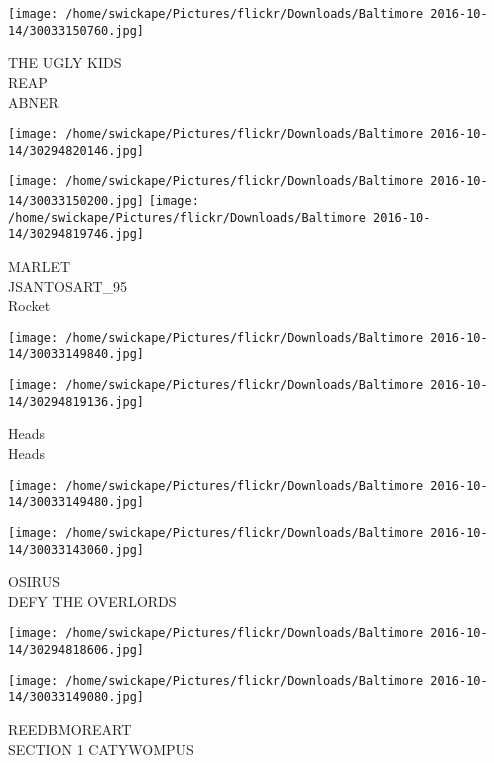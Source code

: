 \documentclass[10pt,letterpaper]{article}
\begin{document}
\vspace{0.25in}
\texttt{[image: /home/swickape/Pictures/flickr/Downloads/Baltimore 2016-10-14/30033150760.jpg]}

THE UGLY KIDS\\
REAP\\
ABNER\\
\pagebreak

\texttt{[image: /home/swickape/Pictures/flickr/Downloads/Baltimore 2016-10-14/30294820146.jpg]}

\vspace{0.25in}
\texttt{[image: /home/swickape/Pictures/flickr/Downloads/Baltimore 2016-10-14/30033150200.jpg]}
\texttt{[image: /home/swickape/Pictures/flickr/Downloads/Baltimore 2016-10-14/30294819746.jpg]}

MARLET\\
JSANTOSART\_95\\
Rocket\\
\pagebreak

\texttt{[image: /home/swickape/Pictures/flickr/Downloads/Baltimore 2016-10-14/30033149840.jpg]}

\vspace{0.25in}
\texttt{[image: /home/swickape/Pictures/flickr/Downloads/Baltimore 2016-10-14/30294819136.jpg]}

Heads\\
Heads\\
\pagebreak

\texttt{[image: /home/swickape/Pictures/flickr/Downloads/Baltimore 2016-10-14/30033149480.jpg]}

\vspace{0.25in}
\texttt{[image: /home/swickape/Pictures/flickr/Downloads/Baltimore 2016-10-14/30033143060.jpg]}

OSIRUS\\
DEFY THE OVERLORDS\\
\pagebreak

\texttt{[image: /home/swickape/Pictures/flickr/Downloads/Baltimore 2016-10-14/30294818606.jpg]}

\vspace{0.25in}
\texttt{[image: /home/swickape/Pictures/flickr/Downloads/Baltimore 2016-10-14/30033149080.jpg]}

REEDBMOREART\\
SECTION 1 CATYWOMPUS\\
\pagebreak
\end{document}
